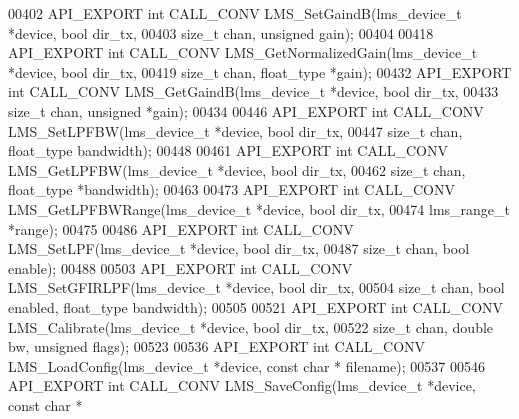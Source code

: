 \begin{DoxyCode}
00402 API_EXPORT \textcolor{keywordtype}{int} CALL_CONV LMS_SetGaindB(lms\_device\_t *device, \textcolor{keywordtype}{bool} dir_tx,
00403                                         \textcolor{keywordtype}{size\_t} chan, \textcolor{keywordtype}{unsigned} gain);
00404 
00418 API_EXPORT \textcolor{keywordtype}{int} CALL_CONV LMS_GetNormalizedGain(lms\_device\_t *device, \textcolor{keywordtype}{bool} dir_tx,
00419                                                 \textcolor{keywordtype}{size\_t} chan, float\_type *gain);
00432 API_EXPORT \textcolor{keywordtype}{int} CALL_CONV LMS_GetGaindB(lms\_device\_t *device, \textcolor{keywordtype}{bool} dir_tx,
00433                                                 \textcolor{keywordtype}{size\_t} chan, \textcolor{keywordtype}{unsigned} *gain);
00434 
00446 API_EXPORT \textcolor{keywordtype}{int} CALL_CONV LMS_SetLPFBW(lms\_device\_t *device, \textcolor{keywordtype}{bool} dir_tx,
00447                                              \textcolor{keywordtype}{size\_t} chan, float\_type bandwidth);
00448 
00461 API_EXPORT \textcolor{keywordtype}{int} CALL_CONV LMS_GetLPFBW(lms\_device\_t *device, \textcolor{keywordtype}{bool} dir_tx,
00462                                             \textcolor{keywordtype}{size\_t} chan, float\_type *bandwidth);
00463 
00473 API_EXPORT \textcolor{keywordtype}{int} CALL_CONV LMS_GetLPFBWRange(lms\_device\_t *device, \textcolor{keywordtype}{bool} dir_tx,
00474                                             lms_range_t *range);
00475 
00486 API_EXPORT \textcolor{keywordtype}{int} CALL_CONV LMS_SetLPF(lms\_device\_t *device, \textcolor{keywordtype}{bool} dir_tx,
00487                                     \textcolor{keywordtype}{size\_t} chan, \textcolor{keywordtype}{bool} enable);
00488 
00503 API_EXPORT \textcolor{keywordtype}{int} CALL_CONV LMS_SetGFIRLPF(lms\_device\_t *device, \textcolor{keywordtype}{bool} dir_tx,
00504                                \textcolor{keywordtype}{size\_t} chan, \textcolor{keywordtype}{bool} enabled, float\_type bandwidth);
00505 
00521 API_EXPORT \textcolor{keywordtype}{int} CALL_CONV LMS_Calibrate(lms\_device\_t *device, \textcolor{keywordtype}{bool} dir_tx,
00522                                         \textcolor{keywordtype}{size\_t} chan, \textcolor{keywordtype}{double} bw, \textcolor{keywordtype}{unsigned} flags);
00523 
00536 API_EXPORT \textcolor{keywordtype}{int} CALL_CONV LMS_LoadConfig(lms\_device\_t *device, \textcolor{keyword}{const} \textcolor{keywordtype}{char} *
      filename);
00537 
00546 API_EXPORT \textcolor{keywordtype}{int} CALL_CONV LMS_SaveConfig(lms\_device\_t *device, \textcolor{keyword}{const} \textcolor{keywordtype}{char} *

\end{DoxyCode}
